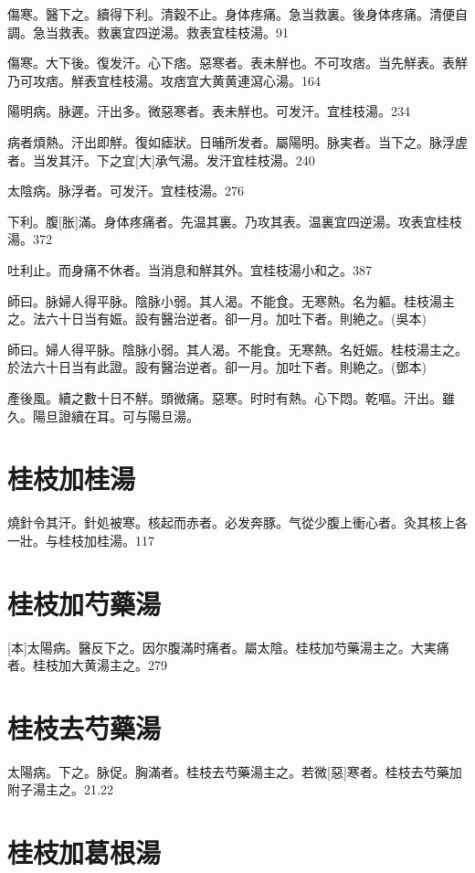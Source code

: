 \documentclass[12pt,twoside,UTF8,b5paper]{ctexbook}
\begin{document}
傷寒。醫下之。續得下利。清穀不止。身体疼痛。急当救裏。後身体疼痛。清便自調。急当救表。救裏宜四逆湯。救表宜桂枝湯。91

傷寒。大下後。復发汗。心下痞。惡寒者。表未觧也。不可攻痞。当先觧表。表觧乃可攻痞。觧表宜桂枝湯。攻痞宜大黄黄連瀉心湯。164

陽明病。脉遲。汗出多。微惡寒者。表未觧也。可发汗。宜桂枝湯。234

病者煩熱。汗出即觧。復如瘧狀。日晡所发者。屬陽明。脉実者。当下之。脉浮虗者。当发其汗。下之宜[大]承气湯。发汗宜桂枝湯。240

太陰病。脉浮者。可发汗。宜桂枝湯。276

下利。腹[胀]滿。身体疼痛者。先温其裏。乃攻其表。温裏宜四逆湯。攻表宜桂枝湯。372

吐利止。而身痛不休者。当消息和觧其外。宜桂枝湯小和之。387

師曰。脉婦人得平脉。陰脉小弱。其人渴。不能食。无寒熱。名为軀。桂枝湯主之。法六十日当有娠。設有醫治逆者。卻一月。加吐下者。則絶之。(吳本)

師曰。婦人得平脉。陰脉小弱。其人渴。不能食。无寒熱。名妊娠。桂枝湯主之。於法六十日当有此證。設有醫治逆者。卻一月。加吐下者。則絶之。(鄧本)

產後風。續之數十日不觧。頭微痛。惡寒。时时有熱。心下悶。乾嘔。汗出。雖久。陽旦證續在耳。可与陽旦湯。

\section{桂枝加桂湯}

燒針令其汗。針処被寒。核起而赤者。必发奔豚。气從少腹上衝心者。灸其核上各一壯。与桂枝加桂湯。117

\section{桂枝加芍藥湯}

[本]太陽病。醫反下之。因尔腹滿时痛者。屬太陰。桂枝加芍藥湯主之。大実痛者。桂枝加大黄湯主之。279

\section{桂枝去芍藥湯}

太陽病。下之。脉促。胸滿者。桂枝去芍藥湯主之。若微[惡]寒者。桂枝去芍藥加附子湯主之。21.22

\section{桂枝加葛根湯}
\end{document}
